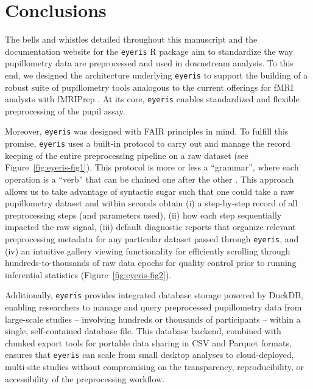 \section{Conclusions}
The bells and whistles detailed throughout this manuscript and the documentation website for the \texttt{eyeris} R package aim to standardize the way pupillometry data are preprocessed and used in downstream analysis. To this end, we designed the architecture underlying \texttt{eyeris} to support the building of a robust suite of pupillometry tools analogous to the current offerings for fMRI analysts with fMRIPrep \parencite{esteban2020analysis,esteban2019fmriprep}. At its core, \texttt{eyeris} enables standardized and flexible preprocessing of the pupil assay.

Moreover, \texttt{eyeris} was designed with FAIR principles in mind. To fulfill this promise, \texttt{eyeris} uses a built-in protocol to carry out and manage the record keeping of the entire preprocessing pipeline on a raw dataset (see Figure~\ref{fig:eyeris-fig1}). This protocol is more or less a ``grammar'', where each operation is a ``verb'' that can be chained one after the other \parencite[see Box~\ref{box:extensions}, which draws inspiration from familiar tidyverse ``pipe'' workflows;][]{wickham2019welcome}. This approach allows us to take advantage of syntactic sugar such that one could take a raw pupillometry dataset and within seconds obtain (i) a step-by-step record of all preprocessing steps (and parameters used), (ii) how each step sequentially impacted the raw signal, (iii) default diagnostic reports that organize relevant preprocessing metadata for any particular dataset passed through \texttt{eyeris}, and (iv) an intuitive gallery viewing functionality for efficiently scrolling through hundreds-to-thousands of raw data epochs for quality control prior to running inferential statistics (Figure~\ref{fig:eyeris-fig2}).

Additionally, \texttt{eyeris} provides integrated database storage powered by DuckDB, enabling researchers to manage and query preprocessed pupillometry data from large-scale studies – involving hundreds or thousands of participants – within a single, self-contained database file. This database backend, combined with chunked export tools for portable data sharing in CSV and Parquet formats, ensures that \texttt{eyeris} can scale from small desktop analyses to cloud-deployed, multi-site studies without compromising on the transparency, reproducibility, or accessibility of the preprocessing workflow.

